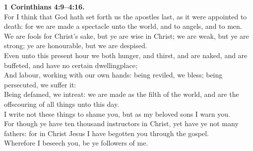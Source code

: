 \documentclass[10pt]{article} %
\begin{document}
{\begin{minipage}[t]{0.45\textwidth}
\textbf{1 Corinthians 4:9--4:16.}\\
For I think that God hath set forth us the apostles last, as it were appointed to death: for we are made a spectacle unto the world, and to angels, and to men.\\
We are fools for Christ's sake, but ye are wise in Christ; we are weak, but ye are strong; ye are honourable, but we are despised.\\
Even unto this present hour we both hunger, and thirst, and are naked, and are buffeted, and have no certain dwellingplace;\\
And labour, working with our own hands: being reviled, we bless; being persecuted, we suffer it:\\
Being defamed, we intreat: we are made as the filth of the world, and are the offscouring of all things unto this day.\\
I write not these things to shame you, but as my beloved sons I warn you.\\
For though ye have ten thousand instructors in Christ, yet have ye not many fathers: for in Christ Jesus I have begotten you through the gospel.\\
Wherefore I beseech you, be ye followers of me.\\

\end{minipage}}
\vspace*{\fill}
\newpage
\Huge%
\vspace*{\fill}
\begin{spacing}{1.3}%
\end{spacing}
\vspace*{\fill}
\end{document}

